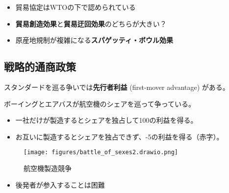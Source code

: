\documentclass[
  xelatex,
  ja=standard]{bxjsarticle}
\providecommand{\tightlist}{%
  \setlength{\itemsep}{0pt}\setlength{\parskip}{0pt}}\usepackage{longtable,booktabs,array}
\begin{document}
\begin{itemize}
\tightlist
\item
  貿易協定はWTOの下で認められている
\item
  \textbf{貿易創造効果}と\textbf{貿易迂回効果}のどちらが大きい？
\item
  原産地規制が複雑になる\textbf{スパゲッティ・ボウル効果}
\end{itemize}

\hypertarget{ux6226ux7565ux7684ux901aux5546ux653fux7b56}{%
\subsection{戦略的通商政策}\label{ux6226ux7565ux7684ux901aux5546ux653fux7b56}}

スタンダードを巡る争いでは\textbf{先行者利益} (first-mover advantage)
がある。

\begin{tcolorbox}[enhanced jigsaw, left=2mm, colframe=quarto-callout-tip-color-frame, colback=white, coltitle=black, rightrule=.15mm, title=\textcolor{quarto-callout-tip-color}{\faLightbulb}\hspace{0.5em}{航空機製造競争}, arc=.35mm, toprule=.15mm, bottomrule=.15mm, leftrule=.75mm, bottomtitle=1mm, toptitle=1mm, titlerule=0mm, breakable, opacitybacktitle=0.6, colbacktitle=quarto-callout-tip-color!10!white, opacityback=0]

ボーイングとエアバスが航空機のシェアを巡って争っている。

\begin{itemize}
\tightlist
\item
  一社だけが製造するとシェアを独占して100の利益を得る。
\item
  お互いに製造するとシェアを独占できず、-5の利益を得る（赤字）。
\end{itemize}

\end{tcolorbox}

\begin{figure}[htpb]

{\centering \texttt{[image: figures/battle\_of\_sexes2.drawio.png]}

}

\caption{航空機製造競争}

\end{figure}

\begin{itemize}
\tightlist
\item
  後発者が参入することは困難
\end{itemize}
\end{document}
